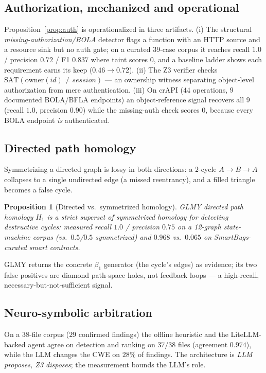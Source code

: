 \documentclass[journal]{IEEEtran}
\newtheorem{proposition}{Proposition}
\begin{document}
\subsection{Authorization, mechanized and operational}
\label{sec:authz}
Proposition~\ref{prop:auth} is operationalized in three artifacts. (i) The
structural \emph{missing-authorization/BOLA} detector flags a function with an
HTTP source and a resource sink but no auth gate; on a curated 39-case corpus it
reaches recall $1.0$ / precision $0.72$ / F1 $0.837$ where taint scores $0$, and a
baseline ladder shows each requirement earns its keep ($0.46\to0.72$). (ii) The
Z3 verifier checks
$\mathrm{SAT}(\mathrm{owner}(id)\neq session)$ --- an ownership witness separating
object-level authorization from mere authentication. (iii) On crAPI ($44$
operations, $9$ documented BOLA/BFLA endpoints) an object-reference signal
recovers all $9$ (recall $1.0$, precision $0.90$) while the missing-auth check
scores $0$, because every BOLA endpoint \emph{is} authenticated.

\subsection{Directed path homology}
\label{sec:glmy}
Symmetrizing a directed graph is lossy in both directions: a $2$-cycle
$A\to B\to A$ collapses to a single undirected edge (a missed reentrancy), and a
filled triangle becomes a false cycle.

\begin{proposition}[Directed vs.\ symmetrized homology]
\label{prop:glmy}
GLMY directed path homology $H_1$ \cite{glmy2012} is a strict superset of
symmetrized homology for
detecting destructive cycles: measured recall $1.0$ / precision $0.75$ on a
12-graph state-machine corpus (vs.\ $0.5$/$0.5$ symmetrized) and $0.968$ vs.\
$0.065$ on SmartBugs-curated smart contracts.
\end{proposition}
GLMY returns the concrete $\beta_1$ generator (the cycle's edges) as evidence; its
two false positives are diamond path-space holes, not feedback loops --- a
high-recall, necessary-but-not-sufficient signal.

\subsection{Neuro-symbolic arbitration}
\label{sec:neuro}
On a 38-file corpus ($29$ confirmed findings) the offline heuristic and the
LiteLLM-backed agent agree on detection and ranking on $37/38$ files (agreement
$0.974$), while the LLM changes the CWE on $28\%$ of findings. The architecture is
\emph{LLM proposes, Z3 disposes}; the measurement bounds the LLM's role.
\end{document}
